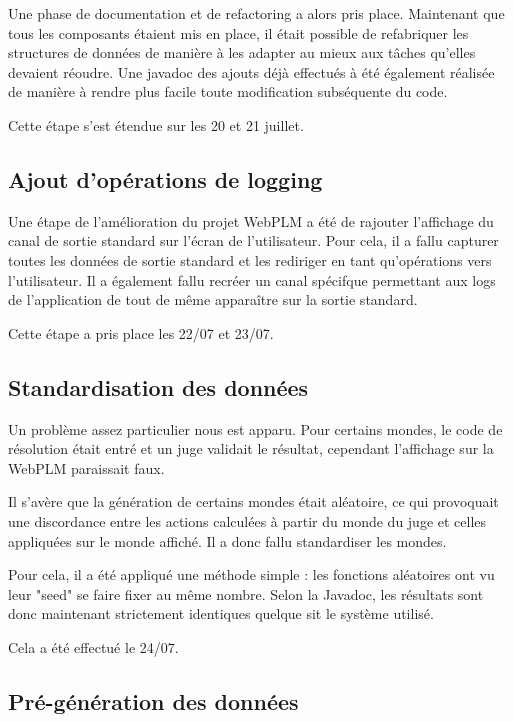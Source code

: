 \documentclass[stage]{tnreport}
\begin{document}
Une phase de documentation et de refactoring a alors pris place. Maintenant que tous les composants étaient mis en place, il était possible de refabriquer les structures de données de manière à les adapter au mieux aux tâches qu'elles devaient réoudre.
Une javadoc des ajouts déjà effectués à été également réalisée de manière à rendre plus facile toute modification subséquente du code.

Cette étape s'est étendue sur les 20 et 21 juillet.

\subsection{Ajout d'opérations de logging}

Une étape de l'amélioration du projet WebPLM a été de rajouter l'affichage du canal de sortie standard sur l'écran de l'utilisateur. Pour cela, il a fallu capturer toutes les données de sortie standard et les rediriger en tant qu'opérations vers l'utilisateur. Il a également fallu recréer un canal spécifque permettant aux logs de l'application de tout de même apparaître sur la sortie standard.

Cette étape a pris place les 22/07 et 23/07.

\subsection{Standardisation des données}

Un problème assez particulier nous est apparu. Pour certains mondes, le code de résolution était entré et un juge validait le résultat, cependant l'affichage sur la WebPLM paraissait faux.

Il s'avère que la génération de certains mondes était aléatoire, ce qui provoquait une discordance entre les actions calculées à partir du monde du juge et celles appliquées sur le monde affiché. Il a donc fallu standardiser les mondes.

Pour cela, il a été appliqué une méthode simple : les fonctions aléatoires ont vu leur "seed" se faire fixer au même nombre. Selon la Javadoc, les résultats sont donc maintenant strictement identiques quelque sit le système utilisé.

Cela a été effectué le 24/07.

\subsection{Pré-génération des données}
\end{document}
